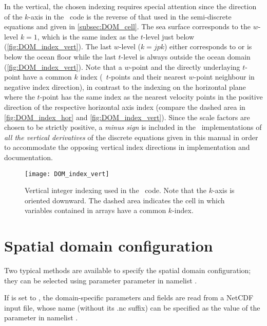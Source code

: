 \documentclass[../main/NEMO_manual]{subfiles}
\begin{document}
In the vertical, the chosen indexing requires special attention since
the direction of the $k$-axis in the \fortran\ code is the reverse of
that used in the semi-discrete equations and given in \autoref{subsec:DOM_cell}.
The sea surface corresponds to the $w$-level $k = 1$,
which is the same index as the $t$-level just below (\autoref{fig:DOM_index_vert}).
The last $w$-level ($k = jpk$) either corresponds to or is below the ocean floor while
the last $t$-level is always outside the ocean domain (\autoref{fig:DOM_index_vert}).
Note that a $w$-point and the directly underlaying $t$-point have a common $k$ index
(\ie\ $t$-points and their nearest $w$-point neighbour in negative index direction),
in contrast to the indexing on the horizontal plane where
the $t$-point has the same index as the nearest velocity points in
the positive direction of the respective horizontal axis index
(compare the dashed area in \autoref{fig:DOM_index_hor} and \autoref{fig:DOM_index_vert}).
Since the scale factors are chosen to be strictly positive,
a \textit{minus sign} is included in the \fortran\ implementations of
\textit{all the vertical derivatives} of the discrete equations given in this manual in order to
accommodate the opposing vertical index directions in implementation and documentation.

\begin{figure}
  \centering
  \texttt{[image: DOM\_index\_vert]}
  \caption[Vertical integer indexing]{
    Vertical integer indexing used in the \fortran\ code.
    Note that the $k$-axis is oriented downward.
    The dashed area indicates the cell in which
    variables contained in arrays have a common $k$-index.}
  \label{fig:DOM_index_vert}
\end{figure}

\section{Spatial domain configuration}
\label{subsec:DOM_config}

Two typical methods are available to specify the spatial domain configuration;
they can be selected using parameter  parameter in
namelist .

If  is set to ,
the domain-specific parameters and fields are read from a NetCDF input file,
whose name (without its .nc suffix) can be specified as
the value of the  parameter in namelist .
\end{document}

